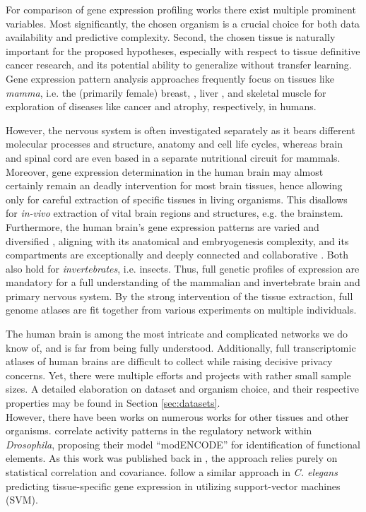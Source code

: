 \documentclass[]{article}
\renewcommand{\cite}{\citep}
\begin{document}
For comparison of gene expression profiling works there exist multiple prominent variables. Most significantly, the chosen organism is a crucial choice for both data availability and predictive complexity. Second, the chosen tissue is naturally important for the proposed hypotheses, especially with respect to tissue definitive cancer research, and its potential ability to generalize without transfer learning. Gene expression pattern analysis approaches frequently focus on tissues like \textit{mamma}, i.e. the (primarily female) breast, \cite{herschkowitz2007identification}, liver \cite{flores2002patterns}, and skeletal muscle \cite{lecker2004multiple} for exploration of diseases like cancer and atrophy, respectively, in humans. 

However, the nervous system is often investigated separately as it bears different molecular processes and structure, anatomy and cell life cycles, whereas brain and spinal cord are even based in a separate nutritional circuit for mammals. Moreover, gene expression determination in the human brain may almost certainly remain an deadly intervention for most brain tissues, hence allowing only for careful extraction of specific tissues in living organisms. This disallows for \textit{in-vivo} extraction of vital brain regions and structures, e.g. the brainstem. Furthermore, the human brain's gene expression patterns are varied and diversified \cite{ramasamy2014genetic}, aligning with its anatomical and embryogenesis complexity, and its compartments are exceptionally and deeply connected and collaborative \cite{fornito2015connectomics}. Both also hold for \textit{invertebrates}, i.e. insects. Thus, full genetic profiles of expression are mandatory for a full understanding of the mammalian and invertebrate brain and primary nervous system. By the strong intervention of the tissue extraction, full genome atlases are fit together from various experiments on multiple individuals.

The human brain is among the most intricate and complicated networks we do know of, and is far from being fully understood. Additionally, full transcriptomic atlases of human brains are difficult to collect while raising decisive privacy concerns. Yet, there were multiple efforts and projects with rather small sample sizes. A detailed elaboration on dataset and organism choice, and their respective properties may be found in Section \ref{sec:datasets}. \\

However, there have been works on numerous works for other tissues and other organisms. \citet{modencode2010identification} correlate activity patterns in the regulatory network within \textit{Drosophila}, proposing their model ``modENCODE'' for identification of functional elements. As this work was published back in \citeyear{modencode2010identification}, the approach relies purely on statistical correlation and covariance. \citet{chikina2009global} follow a similar approach in \textit{C. elegans} predicting tissue-specific gene expression in \citeyear{noble2006support} utilizing support-vector machines (SVM)\cite{noble2006support}. 
\end{document}
